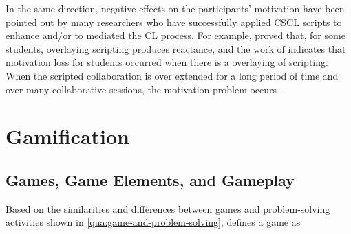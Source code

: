 In the same direction, negative effects on the participants' motivation have been pointed out by many researchers who have successfully applied CSCL scripts to enhance and/or to mediated the CL process. For example,  proved that, for some students, overlaying scripting produces reactance, and the work of  indicates that motivation loss for students occurred when there is a overlaying of scripting. When the scripted collaboration is over extended for a long period of time and over many collaborative sessions, the motivation problem occurs \cite{HronHesseReinhardPicard1997,SchmittWeinberger2018}.



\section{Gamification}
\label{sec:gamification}

\subsection{Games, Game Elements, and Gameplay}

Based on the similarities and differences between games and problem-solving activities shown in \autoref{qua:game-and-problem-solving},  defines a game as   

